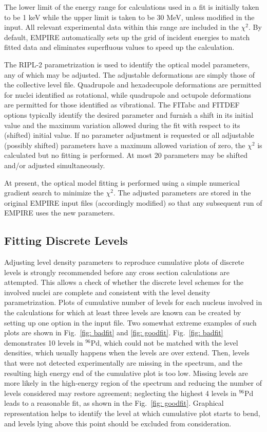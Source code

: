 \documentclass[twocolumn,amsmath,amssymb,10pt,groupedaddress,a4paper]{revtex4}
\begin{document}
The lower limit of the energy range for calculations used in a fit is initially taken to be 1 keV while the upper limit is taken to be 30 MeV, unless modified in the input. All relevant experimental data within this range are included in the $\chi^{2}$.  By default, EMPIRE automatically sets up the grid of incident energies to match fitted data and eliminates superfluous values to speed up the calculation.

The RIPL-2 parametrization is used to identify the optical model parameters, any of which may be adjusted. The adjustable deformations are simply those of the collective level file. Quadrupole and hexadecupole deformations are permitted for nuclei identified as rotational, while quadrupole and octupole deformations are permitted for those identified as vibrational. The FITabc and FITDEF options typically identify the desired parameter and furnish a shift in its initial value and the maximum variation allowed during the fit with respect to its (shifted) initial value. If no parameter adjustment is requested or all adjustable (possibly shifted) parameters have a maximum allowed variation of zero, the $\chi^{2}$ is calculated but no fitting is performed. At most 20 parameters may be shifted and/or adjusted simultaneously.

At present, the optical model fitting is performed using a simple numerical gradient search to minimize the $\chi^{2}$. The adjusted parameters are stored in the original EMPIRE input files (accordingly modified) so that any subsequent run of EMPIRE uses the new parameters.

\subsection{Fitting Discrete Levels}
Adjusting level density parameters to reproduce cumulative plots of discrete levels is strongly recommended before any cross section calculations are attempted. This allows a check of whether the discrete level schemes for the involved nuclei are complete and consistent with the level density parametrization. Plots of cumulative number of levels for each nucleus involved in the calculations for which at least three levels are known can be created by setting up one option in the input file. Two somewhat extreme examples of such plots are shown in Fig.~\ref{fig: badfit} and \ref{fig: goodfit}. Fig.~\ref{fig: badfit} demonstrates 10 levels in $^{96}$Pd, which could not be matched with the level densities, which usually happens when the levels are over extend. Then, levels that were not detected experimentally are missing in the spectrum, and the resulting high energy end of the cumulative plot is too low. Missing levels are more likely in the high-energy region of the spectrum and reducing the number of levels considered may restore agreement; neglecting the highest 4 levels in $^{96}$Pd leads to a reasonable fit, as shown in the Fig.~\ref{fig: goodfit}. Graphical representation helps to identify the level at which cumulative plot starts to bend, and levels lying above this point should be excluded from consideration.
\end{document}
